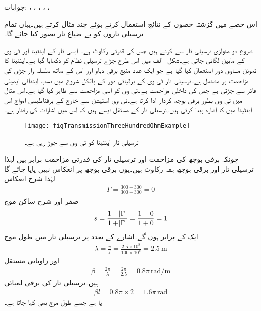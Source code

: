 جوابات: ، ، ، ، ، 

اس حصے میں گزشتہ حصوں کے نتائج استعمال کرتے ہوئے چند مثال کرتے ہیں۔یہاں تمام ترسیلی تاروں کو بے ضیاع تار تصور کیا جائے گا۔

شروع دو متوازی ترسیلی تار سے کرتے ہیں جس کی قدرتی رکاوٹ  ہے۔ ایسی تار  کے اینٹینا اور ٹی وی کے مابین لگائی جاتی ہے۔شکل -الف میں اس طرح جڑے ترسیلی نظام کو دکھایا گیا ہے۔اینٹینا کا تھونن مساوی دور استعمال کیا گیا ہے جو ایک عدد منبع برقی دباو  اور اس کے ساتھ سلسلہ وار  جڑی  کی مزاحمت پر مشتمل ہے۔ترسیلی تار ٹی وی کے برقیاتی دور کے بالکل شروع میں نسب ابتدائی ایمپلی فائر سے جڑتی ہے جس کی داخلی مزاحمت  ہے۔ٹی وی کو اسی مزاحمت سے ظاہر کیا گیا ہے۔اس مثال میں ٹی وی بطور برقی بوجھ کردار ادا کرتا ہے۔ٹی وی اسٹیشن سے خارج  کے برقناطیسی امواج اس اینٹینا میں  کا اشارہ پیدا کرتی ہیں۔ترسیلی تار کے مستقل ایسے ہیں کہ اس میں اشارات کی رفتار  ہے۔

\begin{figure}
\centering
\texttt{[image: figTransmissionThreeHundredOhmExample]}
\caption{ترسیلی تار اینٹینا کو ٹی وی سے جوڑ رہی ہے۔}
\label{شکل_ترسیلی_اینٹینا_تا_ٹی_وی}
\end{figure}

چونکہ برقی بوجھ کی مزاحمت اور ترسیلی تار کی قدرتی مزاحمت برابر ہیں لہٰذا ترسیلی تار اور برقی بوجھ ہمہ رکاوٹ ہیں۔یوں برقی بوجھ پر انعکاس نہیں پایا جائے گا لہٰذا شرح انعکاس
\begin{align*}
\Gamma=\frac{300-300}{300+300}=0
\end{align*}
 صفر اور شرح ساکن موج
\begin{align*}
s=\frac{1-\abs{\Gamma}}{1+\abs{\Gamma}}=\frac{1-0}{1+0}=1
\end{align*}
ایک کے برابر ہوں گے۔اشارے کے تعدد پر ترسیلی تار میں طول موج
\begin{align*}
\lambda=\frac{v}{f}=\frac{2.5 \times 10^8}{100\times 10^6}=\SI{2.5}{\meter}
\end{align*}
اور زاویائی مستقل
\begin{align*}
\beta=\frac{2\pi}{\lambda}=\frac{2\pi}{2.5}=0.8 \pi\, \si{\radian \per \meter}
\end{align*}
 ہیں۔ترسیلی تار کی برقی لمبائی
\begin{align*}
\beta l =0.8 \pi \times 2=1.6 \pi \, \si{\radian}
\end{align*} 
یا  ہے جسے  طول موج بھی کہا جاتا ہے۔ 

